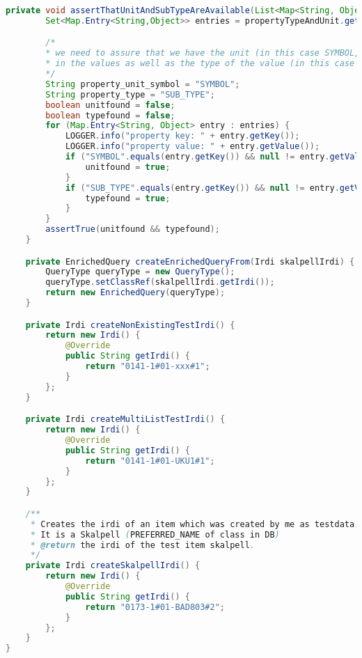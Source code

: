 \begin{lstlisting}[caption=Beispiel eines Integrationstests, language=Java, label=lst:integrationstest_beispiel]
    private void assertThatUnitAndSubTypeAreAvailable(List<Map<String, Object>> propertyTypeAndUnit) {
        Set<Map.Entry<String,Object>> entries = propertyTypeAndUnit.get(0).entrySet();

        /*
        * we need to assure that we have the unit (in this case SYMBOL, e.g. mm or m or cm)
        * in the values as well as the type of the value (in this case real_measure_type)
        */
        String property_unit_symbol = "SYMBOL";
        String property_type = "SUB_TYPE";
        boolean unitfound = false;
        boolean typefound = false;
        for (Map.Entry<String, Object> entry : entries) {
            LOGGER.info("property key: " + entry.getKey());
            LOGGER.info("property value: " + entry.getValue());
            if ("SYMBOL".equals(entry.getKey()) && null != entry.getValue() && !"null".equals(entry.getValue())) {
                unitfound = true;
            }
            if ("SUB_TYPE".equals(entry.getKey()) && null != entry.getValue() && !"null".equals(entry.getValue())) {
                typefound = true;
            }
        }
        assertTrue(unitfound && typefound);
    }

    private EnrichedQuery createEnrichedQueryFrom(Irdi skalpellIrdi) {
        QueryType queryType = new QueryType();
        queryType.setClassRef(skalpellIrdi.getIrdi());
        return new EnrichedQuery(queryType);
    }

    private Irdi createNonExistingTestIrdi() {
        return new Irdi() {
            @Override
            public String getIrdi() {
                return "0141-1#01-xxx#1";
            }
        };
    }

    private Irdi createMultiListTestIrdi() {
        return new Irdi() {
            @Override
            public String getIrdi() {
                return "0141-1#01-UKU1#1";
            }
        };
    }

    /**
     * Creates the irdi of an item which was created by me as testdata.
     * It is a Skalpell (PREFERRED_NAME of class in DB)
     * @return the irdi of the test item skalpell.
     */
    private Irdi createSkalpellIrdi() {
        return new Irdi() {
            @Override
            public String getIrdi() {
                return "0173-1#01-BAD803#2";
            }
        };
    }
}

\end{lstlisting}  
   
